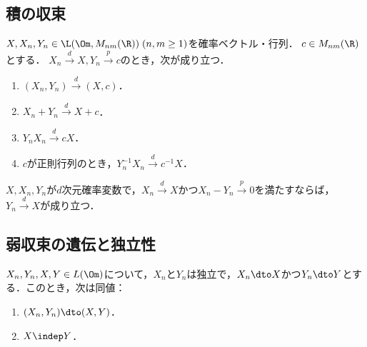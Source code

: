 \documentclass[uplatex,dvipdfmx]{jsreport}
\begin{document}
\subsection{積の収束}

\begin{theorem}[Slutsky]\label{thm-Slutsky}
    $X,X_n,Y_n\in\L(\Om,M_{nm}(\R))\;(n,m\ge1)$を確率ベクトル・行列．
    $c\in M_{nm}(\R)$とする．
    $X_n\xrightarrow{d}X,Y_n\xrightarrow{p}c$のとき，次が成り立つ．
    \begin{enumerate}
        \item $(X_n,Y_n)\xrightarrow{d}(X,c)$．
        \item $X_n+Y_n\xrightarrow{d}X+c$．
        \item $Y_nX_n\xrightarrow{d}cX$．
        \item $c$が正則行列のとき，$Y_n^{-1}X_n\xrightarrow{d}c^{-1}X$．
    \end{enumerate}
\end{theorem}

\begin{corollary}
    $X,X_n,Y_n$が$d$次元確率変数で，$X_n\xrightarrow{d}X$かつ$X_n-Y_n\xrightarrow{p}0$を満たすならば，$Y_n\xrightarrow{d}X$が成り立つ．
\end{corollary}

\subsection{弱収束の遺伝と独立性}

\begin{proposition}
    $X_n,Y_n,X,Y\in L(\Om)$について，$X_n$と$Y_n$は独立で，$X_n\dto X$かつ$Y_n\dto Y$とする．このとき，次は同値：
    \begin{enumerate}
        \item $(X_n,Y_n)\dto (X,Y)$．
        \item $X\indep Y$．
    \end{enumerate}
\end{proposition}
\end{document}
